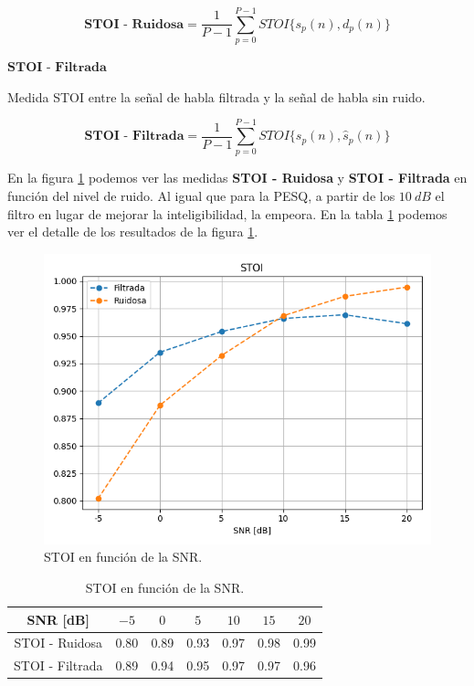 \begin{equation*}
	\textbf{STOI - Ruidosa} = \frac{1}{P-1} \sum_{p=0}^{P-1} STOI\{ s_p(n), d_p(n) \}
\end{equation*}

\noindent $\textbf{STOI - Filtrada}$ 

\vspace{5mm}

Medida STOI entre la señal de habla filtrada y la señal de habla sin ruido. 

\begin{equation*}
	\textbf{STOI - Filtrada} = \frac{1}{P-1} \sum_{p=0}^{P-1} STOI\{ s_p(n), \hat{s}_p(n) \}
\end{equation*}

En la figura \ref{fig:ch6_stoi_by_snr} podemos ver las medidas \textbf{STOI - Ruidosa} y \textbf{STOI - Filtrada} en función del nivel de ruido. Al igual que para la PESQ, a partir de los $\SI{10}{dB}$ el filtro en lugar de mejorar la inteligibilidad, la empeora.  En la tabla \ref{table:stoi_by_snr} podemos ver el detalle de los resultados de la figura \ref{fig:ch6_stoi_by_snr}.

\begin{figure}
	\centering
	\centerline{\includegraphics[scale=0.75]{images/ch6/stoi_by_snr.png}}
	\caption{STOI en función de la SNR.}
	\label{fig:ch6_stoi_by_snr}
\end{figure}

\begin{table}[ht]
	\centering
	\begin{tabular}{ |c|c|c|c|c|c|c| } 
		\hline
		SNR [dB] & $-5$ & $0$ & $5$ & $10$ & $15$ & $20$ \\ 
		\hline
		STOI - Ruidosa & 0.80 & 0.89 & 0.93 & 0.97 & 0.98 & 0.99 \\
		STOI - Filtrada & 0.89 & 0.94 & 0.95 & 0.97 & 0.97 & 0.96 \\
		\hline
	\end{tabular}
	\caption{STOI en función de la SNR.}
	\label{table:stoi_by_snr}
\end{table}

